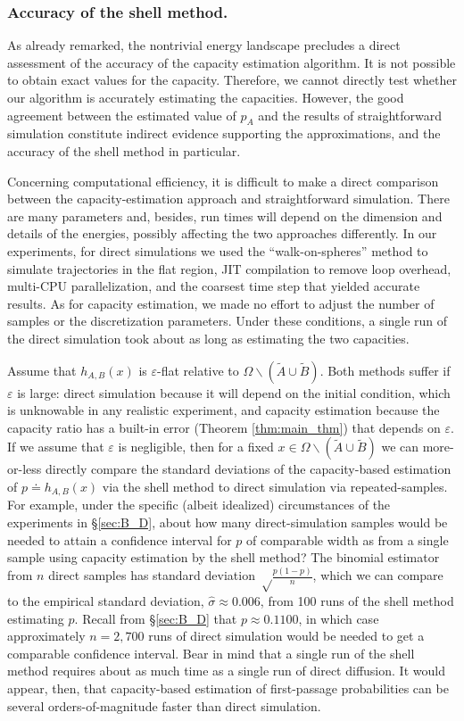 \documentclass[12pt, nofootinbib,english, amsmath, amssymb, aps, priprint, graphicx,floatfix]{revtex4-1}
\theoremstyle{plain}
\theoremstyle{definition}
\theoremstyle{plain}
\begin{document}
\subsubsection{Accuracy of the shell method.}

As already remarked, the nontrivial energy landscape precludes a direct assessment of the accuracy of the capacity estimation algorithm.  It is not possible to obtain exact values for the capacity.  Therefore, we cannot directly test whether our algorithm is accurately estimating the capacities.  However, the good agreement between the estimated value of $p_A$ and the results of straightforward simulation constitute indirect evidence supporting the approximations, and the accuracy of the shell method in particular.

Concerning computational efficiency, it is difficult to make a direct comparison between the capacity-estimation approach and straightforward simulation. There are many parameters and, besides, run times will depend on the dimension and details of the energies, possibly affecting the two approaches differently. In our experiments, for direct simulations we used the ``walk-on-spheres'' method to simulate trajectories in the flat region,\cite{bingham1972random} JIT compilation to remove loop overhead, multi-CPU parallelization, and the coarsest time step that yielded accurate results. As for capacity estimation, we made no effort to adjust the number of samples or the discretization parameters. Under these conditions, a single run of the direct simulation took about as long as estimating the two capacities.

Assume that  $h_{A,B}(x)$ is $\varepsilon$-flat relative to $\Omega \backslash (\tilde A \cup \tilde B)$. Both methods suffer if $\varepsilon$ is large: direct simulation because it will depend on the initial condition, which is unknowable in any realistic experiment, and capacity estimation because the capacity ratio has a built-in error (Theorem \ref{thm:main_thm}) that depends on $\varepsilon$. If we assume that $\varepsilon$ is negligible, then for a fixed $x\in\Omega \backslash (\tilde A \cup \tilde B)$ we can more-or-less directly compare the standard deviations of the capacity-based estimation of $p\doteq h_{A,B}(x)$ via the shell method to direct simulation via repeated-samples. For example, under the specific (albeit idealized) circumstances of the experiments in \S\ref{sec:B_D}, about how many direct-simulation samples would be needed to attain a confidence interval for $p$ of comparable width as from a single sample using capacity estimation by the shell method? The binomial estimator from $n$ direct samples has standard deviation $\sqrt\frac{p(1-p)}{n}$, which we can compare to the empirical standard deviation, $\hat{\sigma}\approx 0.006$, from 100 runs of the shell method estimating $p$. Recall from \S\ref{sec:B_D} that $p\approx 0.1100$, in which case approximately $n=2,700$ runs of direct simulation would be needed to get a comparable confidence interval. Bear in mind that a single run of the shell method requires about as much time as  a single run of direct diffusion. It would appear, then, that capacity-based estimation of first-passage probabilities can be several orders-of-magnitude faster than direct simulation.
\end{document}
